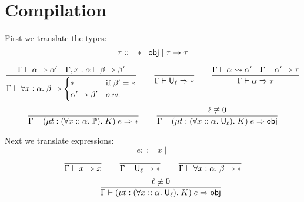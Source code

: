 \section{Compilation}
First we translate the types:
$$\tau::=\ast\mid \mathsf{obj}\mid \tau\to\tau$$

$$\frac{\Gamma\vdash\alpha\Rightarrow \alpha'\quad \Gamma,x:\alpha\vdash \beta\Rightarrow \beta'}
{\Gamma\vdash\forall x:\alpha.\;\beta\Rightarrow
\begin{cases}
\ast&\mbox{if }\beta'=\ast\\
\alpha'\to\beta'&o.w.
\end{cases}}\qquad
\frac{}{\Gamma\vdash\U_\ell\Rightarrow \ast}\qquad
\frac{\Gamma\vdash\alpha\rightsquigarrow \alpha'\quad \Gamma\vdash \alpha'\Rightarrow \tau}
{\Gamma\vdash\alpha\Rightarrow\tau}$$
$$\frac{}{\Gamma\vdash(\mu t:(\forall x::\alpha.\;\P).\;K)\;e\Rightarrow \ast}\qquad
\frac{\ell\not\equiv 0}{\Gamma\vdash(\mu t:(\forall x::\alpha.\;\U_\ell).\;K)\;e\Rightarrow \obj}$$

Next we translate expressions:
$$e::=x\mid $$
$$\frac{}{\Gamma\vdash x\Rightarrow x}\qquad
\frac{}{\Gamma\vdash\U_\ell\Rightarrow \ast}\qquad
\frac{}{\Gamma\vdash\forall x:\alpha.\;\beta\Rightarrow \ast}$$
$$\qquad
\frac{\ell\not\equiv 0}{\Gamma\vdash(\mu t:(\forall x::\alpha.\;\U_\ell).\;K)\;e\Rightarrow \obj}$$

